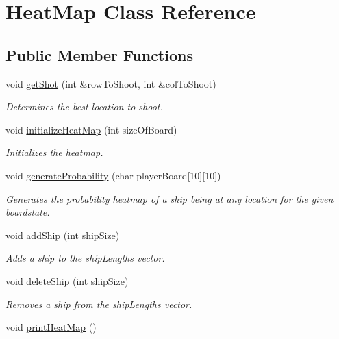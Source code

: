 \hypertarget{classHeatMap}{}\section{Heat\+Map Class Reference}
\label{classHeatMap}
\subsection*{Public Member Functions}
\begin{DoxyCompactItemize}
\item 
void \hyperlink{classHeatMap_a4d05dd4d96d186b99576a3139c70c102}{get\+Shot} (int \&row\+To\+Shoot, int \&col\+To\+Shoot)
\begin{DoxyCompactList}\small\item\em Determines the best location to shoot. \end{DoxyCompactList}\item 
void \hyperlink{classHeatMap_a3b10a4d728c77e5399820f94779bdadd}{initialize\+Heat\+Map} (int size\+Of\+Board)
\begin{DoxyCompactList}\small\item\em Initializes the heatmap. \end{DoxyCompactList}\item 
void \hyperlink{classHeatMap_a8a2f4ca868a52cc02515db6607ae844c}{generate\+Probability} (char player\+Board\mbox{[}10\mbox{]}\mbox{[}10\mbox{]})
\begin{DoxyCompactList}\small\item\em Generates the probability heatmap of a ship being at any location for the given boardstate. \end{DoxyCompactList}\item 
void \hyperlink{classHeatMap_aafeab5a6d0c316502deef11f2d82fbc4}{add\+Ship} (int ship\+Size)
\begin{DoxyCompactList}\small\item\em Adds a ship to the ship\+Lengths vector. \end{DoxyCompactList}\item 
void \hyperlink{classHeatMap_ab5447d4df83bee402e68abb67d136d76}{delete\+Ship} (int ship\+Size)
\begin{DoxyCompactList}\small\item\em Removes a ship from the ship\+Lengths vector. \end{DoxyCompactList}\item 
void \hyperlink{classHeatMap_acf289d30dc8dc913caed601720d30afc}{print\+Heat\+Map} ()\hypertarget{classHeatMap_acf289d30dc8dc913caed601720d30afc}{}\label{classHeatMap_acf289d30dc8dc913caed601720d30afc}


\end{DoxyCompactItemize}
